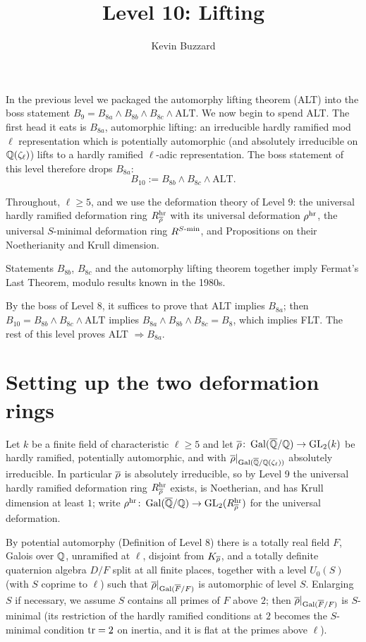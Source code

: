 \documentclass[11pt]{article}
\title{Level 10: Lifting}
\author{Kevin Buzzard}
\date{}
\begin{document}
\maketitle

\noindent
In the previous level we packaged the automorphy lifting theorem (ALT) into the
boss statement $B_9=B_{8a}\wedge B_{8b}\wedge B_{8c}\wedge\text{ALT}$. We now
begin to spend ALT. The first head it eats is $B_{8a}$, automorphic lifting: an
irreducible hardly ramified mod $\ell$ representation which is potentially
automorphic (and absolutely irreducible on $\mathbb{Q}(\zeta_\ell)$) lifts to a hardly
ramified $\ell$-adic representation. The boss statement of this level therefore
drops $B_{8a}$:
\[
  B_{10} := B_{8b}\wedge B_{8c}\wedge\text{ALT}.
\]

Throughout, $\ell\geq5$, and we use the deformation theory of Level 9: the
universal hardly ramified deformation ring $R^{\mathrm{hr}}_{\overline{\rho}}$ with its
universal deformation $\rho^{\mathrm{hr}}$, the universal $S$-minimal deformation ring
$R^{S\text{-}\mathrm{min}}$, and Propositions on their Noetherianity and Krull
dimension.

\begin{theorem}\label{thm:boss10}
Statements $B_{8b}$, $B_{8c}$ and the automorphy lifting theorem together imply
Fermat's Last Theorem, modulo results known in the 1980s.
\end{theorem}

By the boss of Level 8, it suffices to prove that ALT implies $B_{8a}$; then
$B_{10}=B_{8b}\wedge B_{8c}\wedge\text{ALT}$ implies
$B_{8a}\wedge B_{8b}\wedge B_{8c}=B_8$, which implies FLT. The rest of this
level proves ALT $\Rightarrow B_{8a}$.

\section{Setting up the two deformation rings}

Let $k$ be a finite field of characteristic $\ell\geq5$ and let
$\overline{\rho}\colon\operatorname{Gal}(\overline{\mathbb{Q}}/\mathbb{Q})\to\operatorname{GL}_2(k)$ be hardly ramified, potentially automorphic, and
with $\overline{\rho}|_{\operatorname{Gal}(\overline{\mathbb{Q}}/\mathbb{Q}(\zeta_\ell))}$ absolutely irreducible. In
particular $\overline{\rho}$ is absolutely irreducible, so by Level 9 the universal
hardly ramified deformation ring $R^{\mathrm{hr}}_{\overline{\rho}}$ exists, is Noetherian, and
has Krull dimension at least $1$; write
$\rho^{\mathrm{hr}}\colon\operatorname{Gal}(\overline{\mathbb{Q}}/\mathbb{Q})\to\operatorname{GL}_2(R^{\mathrm{hr}}_{\overline{\rho}})$ for the universal deformation.

By potential automorphy (Definition of Level 8) there is a totally real field
$F$, Galois over $\mathbb{Q}$, unramified at $\ell$, disjoint from $K_{\overline{\rho}}$, and a
totally definite quaternion algebra $D/F$ split at all finite places, together
with a level $U_0(S)$ (with $S$ coprime to $\ell$) such that $\overline{\rho}|_{\operatorname{Gal}(\overline{F}/F)}$ is
automorphic of level $S$. Enlarging $S$ if necessary, we assume $S$ contains all
primes of $F$ above $2$; then $\overline{\rho}|_{\operatorname{Gal}(\overline{F}/F)}$ is $S$-minimal (its restriction
of the hardly ramified conditions at $2$ becomes the $S$-minimal condition
$\operatorname{tr}=2$ on inertia, and it is flat at the primes above $\ell$).
\end{document}
